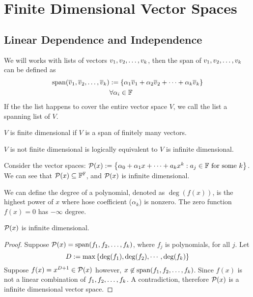\section{Finite Dimensional Vector Spaces}
\subsection{Linear Dependence and Independence} 
\begin{definition}
    We will works with lists of vectors ${v}_1,{v}_2, \ldots, {v}_{k}$, then the span of ${v}_1,{v}_2, \ldots, {v}_{k}$ can be defined as
    \begin{align*}
         \text{span} ({\overline v}_1,{\overline v}_2, \ldots, {\overline v}_{k}) &:= \left\{ \alpha_1\overline v_1 + \alpha_2 \overline v_2 + \cdots  + \alpha_k \overline v_k \right\} \\
        & \forall \alpha_i \in \mathbb F 
    \end{align*}
    If the the list happens to cover the entire vector space $V$, we call the list a spanning list of $V$.
\end{definition}
\begin{definition}
    $V$ is finite dimensional if $V$ is a span of finitely many vectors.
\end{definition}
\begin{remark}
    $V$ is not finite dimensional is logically equivalent to $V$ is infinite dimensional.
\end{remark}
\begin{example}
    Consider the vector spaces: $\mathcal P(x) : = \left\{ \alpha_0 + \alpha_1 x + \cdots + a_kx^k : a_j \in \mathbb F \text{ for some } k \right\}$. We can see that $\mathcal P(x) \subseteq \mathbb F^{\mathbb F}$, and $\mathcal P(x)$ is infinite dimensional.
\end{example}
\begin{definition}
    We can define the degree of a polynomial, denoted as $\deg(f(x))$, is the highest power of $x$ where hose coefficient ($\alpha_k$) is nonzero. The zero function $f(x) = 0$ has $-\infty$ degree. 
\end{definition} 
\begin{example}
    $\mathcal P(x)$ is infinite dimensional.
\end{example}
\begin{proof}
    Suppose $\mathcal P(x) = \text{span}({f}_1,{f}_2, \ldots, {f}_{k})$, where $f_j$ is polynomials, for all $j$. 
    Let \[D := \text{max}\left\{\deg(f_1), \deg(f_2), \cdots, \deg(f_k)\right\}\] Suppose $f(x) =  x^{D + 1} \in \mathcal P(x)$ however, $x \not\in \text{span}({f}_1,{f}_2, \ldots, {f}_{k})$. Since $f(x)$ is not a linear combination of ${f}_1,{f}_2, \ldots, {f}_{k}$. A contradiction, therefore $\mathcal P(x)$ is a infinite dimensional vector space.
\end{proof}
